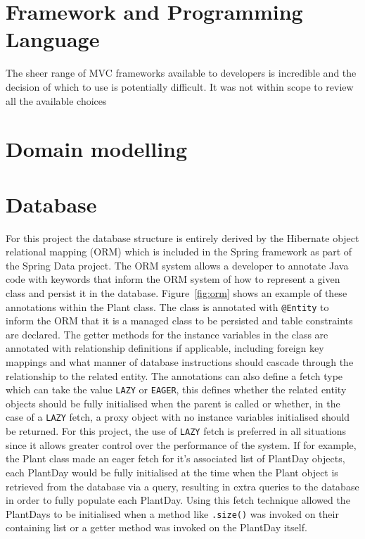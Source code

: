 \section{Framework and Programming Language}

The sheer range of MVC frameworks available to developers is incredible and the decision of which to use is potentially difficult. It was not within scope to review all the available choices 

\section{Domain modelling}



\section{Database}

For this project the database structure is entirely derived by the Hibernate\cite{_hibernate} object relational mapping (ORM) which is included in the Spring framework as part of the Spring Data project. The ORM system allows a developer to annotate Java code with keywords that inform the ORM system of how to represent a given class and persist it in the database. Figure~\ref{fig:orm} shows an example of these annotations within the Plant class. The class is annotated with \texttt{@Entity} to inform the ORM that it is a managed class to be persisted and table constraints are declared. The getter methods for the instance variables in the class are annotated with relationship definitions if applicable, including foreign key mappings and what manner of database instructions should cascade through the relationship to the related entity. The annotations can also define a fetch type which can take the value \texttt{LAZY} or \texttt{EAGER}, this defines whether the related entity objects should be fully initialised when the parent is called or whether, in the case of a \texttt{LAZY} fetch, a proxy object with no instance variables initialised should be returned. For this project, the use of \texttt{LAZY} fetch is preferred in all situations since it allows greater control over the performance of the system. If for example, the Plant class made an eager fetch for it's associated list of PlantDay objects, each PlantDay would be fully initialised at the time when the Plant object is retrieved from the database via a query, resulting in extra queries to the database in order to fully populate each PlantDay. Using this fetch technique allowed the PlantDays to be initialised when a method like \texttt{.size()} was invoked on their containing list or a getter method was invoked on the PlantDay itself. 

